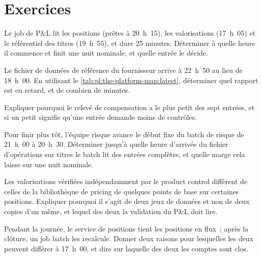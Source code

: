 \section{Exercices}

\begin{exercise}[$\star$]\label{exo:pl:the-platform-map:1}
Le job de P\&L lit les positions (prêtes à 20~h~15), les valorisations (17~h~05) et le référentiel des titres (19~h~55), et dure 25 minutes.
Déterminer à quelle heure il commence et finit une nuit nominale, et quelle entrée le décide.
\end{exercise}

\begin{exercise}[$\star$]\label{exo:pl:the-platform-map:2}
Le fichier de données de référence du fournisseur arrive à 22~h~50 au lieu de 18~h~00. En utilisant le \cref{tab:pl:the-platform-map:latest},
déterminer quel rapport est en retard, et de combien de minutes.
\end{exercise}

\begin{exercise}[$\star$]\label{exo:pl:the-platform-map:3}
Expliquer pourquoi le relevé de compensation a le plus petit  des sept entrées, et si un petit 
signifie qu'une entrée demande moins de contrôles.
\end{exercise}

\begin{exercise}[$\star\star$]\label{exo:pl:the-platform-map:4}
Pour finir plus tôt, l'équipe risque avance le début fixe du batch de risque de 21~h~00 à 20~h~30. Déterminer jusqu'à quelle heure
d'arrivée du fichier d'opérations sur titres le batch lit des entrées complètes, et quelle marge cela laisse sur une nuit nominale.
\end{exercise}

\begin{exercise}[$\star\star$]\label{exo:pl:the-platform-map:5}
Les valorisations vérifiées indépendamment par le product control diffèrent de celles de la bibliothèque de pricing de quelques points de base sur certaines positions.
Expliquer pourquoi il s'agit de deux jeux de données et non de deux copies d'un même, et lequel des deux la validation du P\&L doit lire.
\end{exercise}

\begin{exercise}[$\star\star$]\label{exo:pl:the-platform-map:6}
Pendant la journée, le service de positions tient les positions en flux~; après la clôture, un job batch les recalcule. Donner deux raisons
pour lesquelles les deux peuvent différer à 17~h~00, et dire sur laquelle des deux les comptes sont clos.
\end{exercise}

